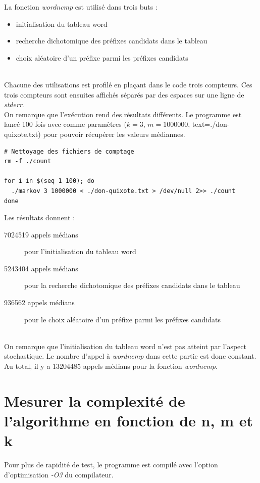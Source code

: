 \documentclass[10pt, a4paper]{article}
\begin{document}
La fonction \emph{wordncmp} est utilisé dans trois buts : \\
\begin{itemize}
  \item initialisation du tableau word
  \item recherche dichotomique des préfixes candidats dans le tableau
  \item choix aléatoire d'un préfixe parmi les préfixes candidats
\end{itemize}
~\\

Chacune des utilisations est profilé en plaçant dans le code trois compteurs.
Ces trois compteurs sont ensuites affichés séparés par des espaces sur une
ligne de \emph{stderr}. \\

On remarque que l'exécution rend des résultats différents. Le programme est
lancé 100 fois avec comme paramètres ($k=3$, $m=1000000$,
text=./don-quixote.txt) pour pouvoir récupérer les valeurs médiannes. \\

\begin{verbatim}
# Nettoyage des fichiers de comptage
rm -f ./count

for i in $(seq 1 100); do
  ./markov 3 1000000 < ./don-quixote.txt > /dev/null 2>> ./count
done
\end{verbatim}

Les résultats donnent : \\
\begin{description}
  \item[7024519 appels médians] pour l'initialisation du tableau word
  \item[5243404 appels médians] pour la recherche dichotomique des préfixes
    candidats dans le tableau
  \item[936562 appels médians] pour le choix aléatoire d'un préfixe parmi les
    préfixes candidats
\end{description}
~\\

On remarque que l'initialisation du tableau word n'est pas atteint par l'aspect
stochastique. Le nombre d'appel à \emph{wordncmp} dans cette partie est donc
constant. \\

Au total, il y a $13204485$ appels médians pour la fonction \emph{wordncmp}. \\

\section{Mesurer la complexité de l'algorithme en fonction de n, m et k}

Pour plus de rapidité de test, le programme est compilé avec l'option
d'optimisation \emph{-O3} du compilateur. \\
\end{document}
